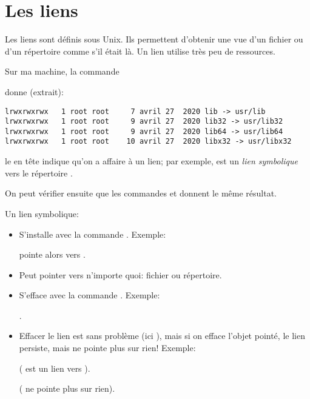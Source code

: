 \section{Les liens}
Les liens sont  définis sous Unix. Ils permettent
d'obtenir une vue d'un fichier ou d'un répertoire \og comme s'il était
là\fg. Un lien utilise très peu de ressources.

Sur ma machine, la commande


donne (extrait):

\begin{verbatim}
lrwxrwxrwx   1 root root     7 avril 27  2020 lib -> usr/lib
lrwxrwxrwx   1 root root     9 avril 27  2020 lib32 -> usr/lib32
lrwxrwxrwx   1 root root     9 avril 27  2020 lib64 -> usr/lib64
lrwxrwxrwx   1 root root    10 avril 27  2020 libx32 -> usr/libx32
\end{verbatim}
le  en tête indique qu'on a affaire à un lien; par exemple,
 est un \emph{lien symbolique} vers le répertoire 
  .

  On peut vérifier ensuite que les commandes   et
   donnent le même résultat.

  Un lien symbolique:
  \begin{itemize}
  \item S'installe avec la commande . Exemple:


     pointe alors vers .
  \item Peut pointer vers n'importe quoi: fichier ou répertoire.
  \item S'efface avec la commande . Exemple:

    .
  \item  \textdbend Effacer le lien est sans problème (ici
    ), mais si on efface l'objet pointé, le lien persiste,
    mais ne pointe plus sur rien! Exemple:


     (  est un lien vers ).

     ( ne pointe plus sur rien).

    \begin{center}
    \end{center}
    
  \end{itemize}

